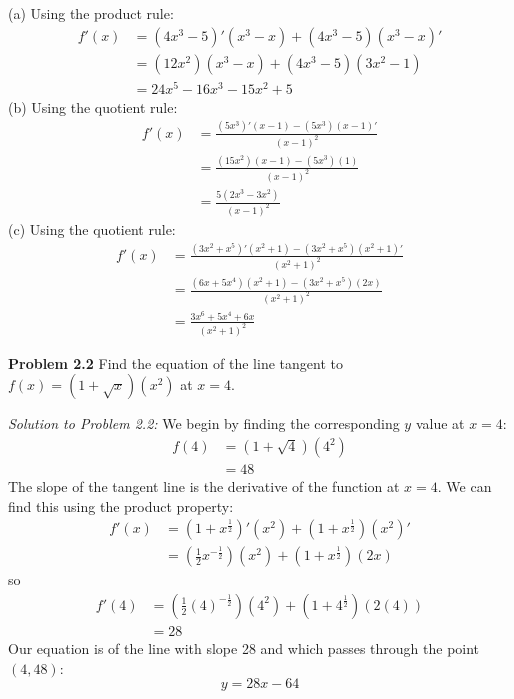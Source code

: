 \documentclass[11pt]{scrartcl}
\begin{document}
(a) Using the product rule:
\begin{align*}
    f'(x) & = (4x^3-5)'(x^3-x)+(4x^3-5)(x^3-x)'\\
          & = (12x^2)(x^3-x)+(4x^3-5)(3x^2-1)\\
          & = 24x^5-16x^3-15x^2+5
\end{align*}
(b) Using the quotient rule:
\begin{align*}
    f'(x) & = \frac{(5x^3)'(x-1)-(5x^3)(x-1)'}{(x-1)^2}\\
          & = \frac{(15x^2)(x-1)-(5x^3)(1)}{(x-1)^2}\\
          & = \frac{5(2x^3-3x^2)}{(x-1)^2}
\end{align*}
(c) Using the quotient rule:
\begin{align*}
    f'(x) & = \frac{(3x^2+x^5)'(x^2+1)-(3x^2+x^5)(x^2+1)'}{(x^2+1)^2}\\
          & = \frac{(6x+5x^4)(x^2+1)-(3x^2+x^5)(2x)}{(x^2+1)^2}\\
          & = \frac{3x^6+5x^4+6x}{(x^2+1)^2}
\end{align*}
\begin{tcolorbox}
[colback=purple!5!white,colframe=purple!75!black]
\textbf{Problem 2.2} Find the equation of the line tangent to $f(x)=(1+\sqrt x)(x^2)$ at $x=4$.
\end{tcolorbox}
\noindent
\textit{Solution to Problem 2.2:} We begin by finding the corresponding $y$ value at $x=4$:
\begin{align*}
    f(4) & = (1+ \sqrt 4)(4^2)\\
         & = 48 
\end{align*}
The slope of the tangent line is the derivative of the function at $x=4$. We can find this using the product property:
\begin{align*}
    f'(x) & = (1+x^{\frac{1}{2}})'(x^2)+(1+x^{\frac{1}{2}})(x^2)'\\
          & = (\frac{1}{2}x^{-\frac{1}{2}})(x^2)+(1+x^{\frac{1}{2}})(2x)
\end{align*}
\noindent 
so
\begin{align*}
    f'(4) & = (\frac{1}{2}(4)^{-\frac{1}{2}})(4^2)+(1+4^\frac{1}{2})(2(4))\\
          & = 28
\end{align*}
Our equation is of the line with slope 28 and which passes through the point $(4,48)$:
$$y=28x-64$$
\end{document}
